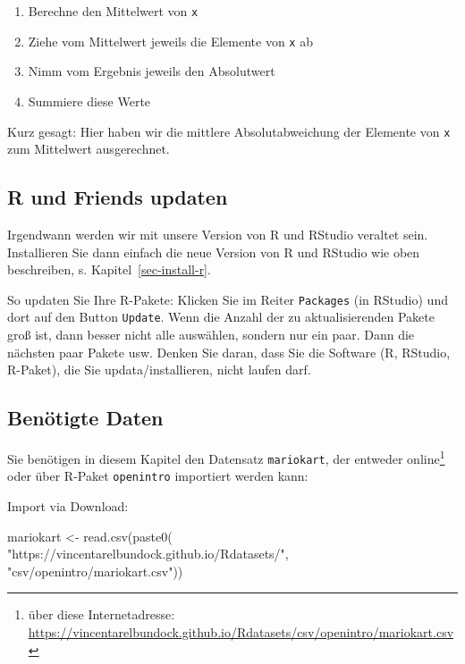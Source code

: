 \documentclass[
  letterpaper,
  oneside,
  open=any]{scrbook}
\newenvironment{Shaded}{\begin{snugshade}}{\end{snugshade}}
\newcommand{\FunctionTok}[1]{\textcolor[rgb]{0.28,0.35,0.67}{#1}}
\newcommand{\NormalTok}[1]{\textcolor[rgb]{0.00,0.23,0.31}{#1}}
\newcommand{\OtherTok}[1]{\textcolor[rgb]{0.00,0.23,0.31}{#1}}
\newcommand{\StringTok}[1]{\textcolor[rgb]{0.13,0.47,0.30}{#1}}
\providecommand{\tightlist}{%
  \setlength{\itemsep}{0pt}\setlength{\parskip}{0pt}}\usepackage{longtable,booktabs,array}
\theoremstyle{definition}
\theoremstyle{definition}
\theoremstyle{definition}
\theoremstyle{remark}
\begin{document}
\begin{enumerate}
\def\labelenumi{\arabic{enumi}.}
\tightlist
\item
  Berechne den Mittelwert von \texttt{x}
\item
  Ziehe vom Mittelwert jeweils die Elemente von \texttt{x} ab
\item
  Nimm vom Ergebnis jeweils den Absolutwert
\item
  Summiere diese Werte
\end{enumerate}

Kurz gesagt: Hier haben wir die mittlere Absolutabweichung der Elemente
von \texttt{x} zum Mittelwert ausgerechnet.

\subsection{R und Friends updaten}\label{r-und-friends-updaten}

Irgendwann werden wir mit unsere Version von R und RStudio veraltet
sein. Installieren Sie dann einfach die neue Version von R und RStudio
wie oben beschreiben, s. Kapitel~\ref{sec-install-r}.

So updaten Sie Ihre R-Pakete: Klicken Sie im Reiter \texttt{Packages}
(in RStudio) und dort auf den Button \texttt{Update}. Wenn die Anzahl
der zu aktualisierenden Pakete groß ist, dann besser nicht alle
auswählen, sondern nur ein paar. Dann die nächsten paar Pakete usw.
Denken Sie daran, dass Sie die Software (R, RStudio, R-Paket), die Sie
updata/installieren, nicht laufen darf.

\subsection{Benötigte Daten}\label{benuxf6tigte-daten-1}

Sie benötigen in diesem Kapitel den Datensatz \texttt{mariokart}, der
entweder online\footnote{ über diese Internetadresse:
  \url{https://vincentarelbundock.github.io/Rdatasets/csv/openintro/mariokart.csv}}
oder über R-Paket \texttt{openintro} importiert werden kann:

Import via Download:

\begin{Shaded}
\begin{Highlighting}[]
\NormalTok{mariokart }\OtherTok{\textless{}{-}} \FunctionTok{read.csv}\NormalTok{(}\FunctionTok{paste0}\NormalTok{(}
  \StringTok{"https://vincentarelbundock.github.io/Rdatasets/"}\NormalTok{,}
  \StringTok{"csv/openintro/mariokart.csv"}\NormalTok{))}
\end{Highlighting}
\end{Shaded}
\end{document}
